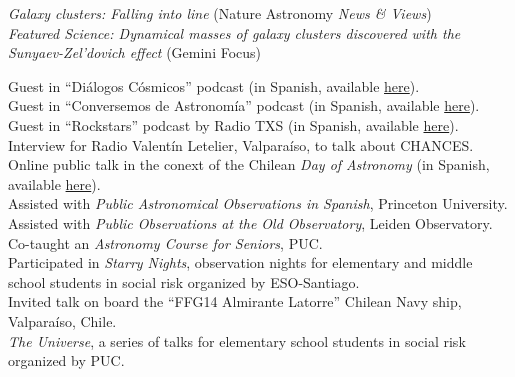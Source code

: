 \documentclass[11pt]{article}
\begin{document}



\noindent
 \emph{Galaxy clusters: Falling into line} (Nature Astronomy \emph{News \& Views})\\
 \emph{Featured Science: Dynamical masses of galaxy clusters discovered with the Sunyaev-Zel'dovich effect} (Gemini Focus)


\noindent
{} Guest in ``Di\'alogos C\'osmicos'' podcast (in Spanish, available \href{https://www.youtube.com/watch?v=6hFChKVBkH8&pp=ygURZGlhbG9nb3MgY29zbWljb3M%3D}{here}).\\
 Guest in ``Conversemos de Astronomía'' podcast (in Spanish, available \href{https://open.spotify.com/episode/4PBTlnI3ufDtBwXIGee5mp?si=KGS43HFnSuiVdVPYaoBMqA}{here}).\\
 Guest in ``Rockstars'' podcast by Radio TXS (in Spanish, available \href{https://soundcloud.com/txsplus/rockstars-con-gabriel-leon-y-cristobal-sifon-4-de-noviembre-del-2022?utm_source=Email&utm_campaign=social_sharing&utm_medium=widgetutm_content=https%3A%2F%2Fsoundcloud.com%2Ftxsplus%2Frockstars-con-gabriel-leon-y-cristobal-sifon-4-de-noviembre-del-2022}{here}).\\
 Interview for Radio Valent\'in Letelier, Valparaíso, to talk about CHANCES.\\
 Online public talk in the conext of the Chilean \textit{Day of Astronomy} (in Spanish, available \href{https://www.youtube.com/watch?v=MgrKSd6JWkE}{here}).\\
 Assisted with \emph{Public Astronomical Observations in Spanish}, Princeton University.\\
 Assisted with \emph{Public Observations at the Old Observatory}, Leiden Observatory.\\
 Co-taught an \emph{Astronomy Course for Seniors}, PUC.\\
 Participated in \emph{Starry Nights}, observation nights for 
elementary and middle school students in social risk organized by ESO-Santiago.\\
 Invited talk on board the ``FFG14 Almirante Latorre'' Chilean Navy ship, Valpara\'iso, Chile.\\
 \emph{The Universe}, a series of talks for elementary school students in social risk organized by PUC.\\
\end{document}
